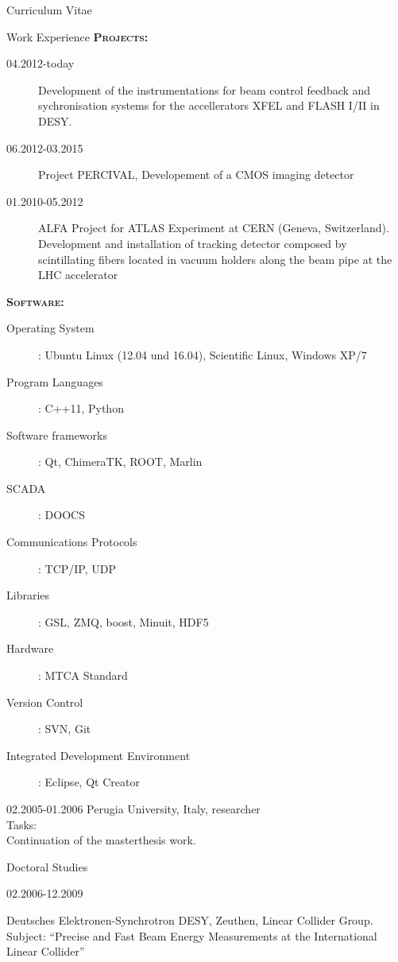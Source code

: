 \documentclass[11pt,a4paper]{scrartcl}
\begin{document}
\begin{cv}{Curriculum Vitae}
\begin{cvlist}{Work Experience}
{\scshape {\bfseries Projects:}}
\begin{description}
\item[04.2012-today] Development of the instrumentations for beam control
feedback and sychronisation systems for the accellerators XFEL and FLASH I/II in
DESY.
\item[06.2012-03.2015]Project PERCIVAL, Developement of a CMOS imaging
detector
\item[01.2010-05.2012]ALFA Project for ATLAS Experiment at CERN (Geneva,
Switzerland). Development and installation of tracking detector composed by
scintillating fibers  located in vacuum holders along the beam pipe at the LHC
accelerator
\end{description}
{\scshape {\bfseries Software:}}
\begin{description}
\item[Operating System] : Ubuntu Linux (12.04 und 16.04), Scientific Linux,
Windows XP/7
\item[Program Languages] : C++11, Python
\item[Software frameworks] : Qt, ChimeraTK, ROOT, Marlin
\item[SCADA] : DOOCS
\item[Communications Protocols] : TCP/IP, UDP
\item[Libraries] : GSL, ZMQ, boost, Minuit, HDF5
\item[Hardware] : MTCA Standard
\item[Version Control] : SVN, Git
\item[Integrated Development Environment] : Eclipse, Qt Creator
\end{description}

\vspace{\baselineskip}

\item[02.2005-01.2006] Perugia
University, Italy, researcher \\

Tasks:\\

Continuation of the masterthesis work.

\end{cvlist}

\begin{cvlist}{Doctoral Studies}
\item[02.2006-12.2009]

Deutsches Elektronen-Synchrotron DESY, Zeuthen, Linear Collider
Group.\\ Subject:
"`Precise and Fast Beam Energy Measurements at the International
Linear Collider"'


\end{cvlist}
\end{cv}
\end{document}
